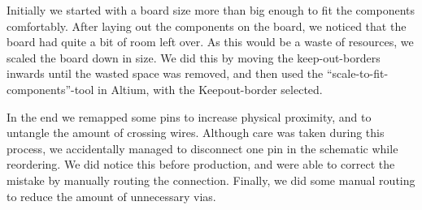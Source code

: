 Initially we started with a board size more than big enough to fit the components comfortably. After laying out the components on the board, we noticed that the board had quite a bit of room left over. As this would be a waste of resources, we scaled the board down in size. We did this by moving the keep-out-borders inwards until the wasted space was removed, and then used the ``scale-to-fit-components''-tool in Altium, with the Keepout-border selected.

In the end we remapped some pins to increase physical proximity, and to untangle the amount of crossing wires. Although care was taken during this process, we accidentally managed to disconnect one pin in the schematic while reordering. We did notice this before production, and were able to correct the mistake by manually routing the connection. Finally, we did some manual routing to reduce the amount of unnecessary vias.  

